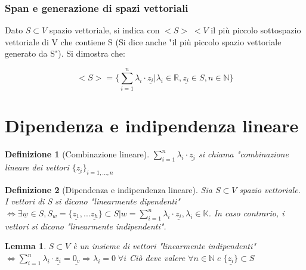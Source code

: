 \documentclass[12pt]{article}
\newenvironment{para}{\begin{adjustwidth}{13mm}{}}{\end{adjustwidth}}
\newtheorem{Definizione}{Definizione}[subsection]
\newtheorem{Lemma}{Lemma}[subsection]
\begin{document}
\begin{para}
\subsubsection{Span e generazione di spazi vettoriali}
Dato $S \subset V$ spazio vettoriale, si indica con $<S> \; < V$ il più piccolo sottospazio vettoriale di V che contiene S (Si dice anche "il più piccolo spazio vettoriale generato da S"). Si dimostra che:  

$$<S> = \{\sum_{i = 1}^{n} \lambda_i \cdot \underline{z_i} | \lambda_i \in \mathbb{R}, \underline{z_i} \in S, n\in \mathbb{N}\} $$


\section{Dipendenza e indipendenza lineare}
\begin{Definizione}[Combinazione lineare]
$\sum_{i = 1}^{n} \lambda_i \cdot \underline{z_i}$ si chiama "combinazione lineare dei vettori $\{\underline{z_i}\}_{i=1,...,n}$
\end{Definizione}
\begin{Definizione} [Dipendenza e indipendenza lineare]
Sia $S \subset V$ spazio vettoriale. I vettori di S si dicono "linearmente dipendenti" $\Leftrightarrow \exists \underline{w} \in S, S_w = \{\underline{z_1}, ... \underline{z_h}\} \subset S | w = \sum_{i = 1}^{n} \lambda_i \cdot \underline{z_i}, \lambda_i \in \mathbb{K}$. In caso contrario, i vettori si dicono "linearmente indipendenti".
\end{Definizione}
\begin{Lemma}
$S \subset V$ è un insieme di vettori "linearmente indipendenti" $\Leftrightarrow \sum_{i = 1}^{n} \lambda_i \cdot \underline{z_i} = \underline{0_v} \Rightarrow \lambda_i = 0 \; \forall i$ Ciò deve valere $\forall n \in \mathbb{N} \; e \; \{\underline{z_i}\} \subset S$
\end{Lemma}


\end{para}
\end{document}
